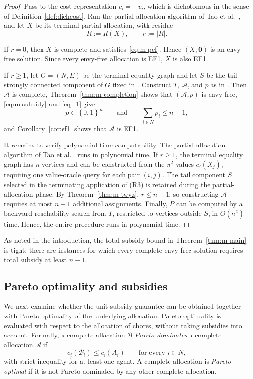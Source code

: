 \documentclass[sigconf,anonymous]{aamas}
\newcommand{\agents}{N}
\newcommand{\alloc}{\mathcal{A}}
\newcommand{\allocB}{\mathcal{B}}
\newcommand{\bundle}[1]{A_{#1}}
\newcommand{\subsidy}{p}
\newcommand{\cost}{c}
\newcommand{\set}[1]{\left\{#1\right\}}
\newcommand{\abs}[1]{\left\lvert#1\right\rvert}
\theoremstyle{acmplain}
\theoremstyle{acmdefinition}
\theoremstyle{acmplain}
\begin{document}
\begin{proof}
Pass to the cost representation $\cost_i=-v_i$, which is dichotomous in the sense of Definition~\ref{def:dichcost}. Run the partial-allocation algorithm of Tao et al.~\cite{tao2025existence}, and let $X$ be its terminal partial allocation, with residue
\[ R:=R(X), \qquad r:=\abs R.
\]

If $r=0$, then $X$ is complete and satisfies~\eqref{eq:m-pef}. Hence $(X,\mathbf 0)$ is an envy-free solution. Since every envy-free allocation is EF1, $X$ is also EF1.

If $r\geq 1$, let $G=(\agents,E)$ be the terminal equality graph and let $S$ be the tail strongly connected component of $G$ fixed in . Construct $T$, $\alloc$, and $\subsidy$ as in . Then $\alloc$ is complete, Theorem~\ref{thm:m-completion} shows that $(\alloc,\subsidy)$ is envy-free, \eqref{eq:m-subsidy} and \eqref{eq_1} give \[
    \subsidy\in\set{0,1}^n
    \qquad\text{and}\qquad
    \sum_{i\in\agents}\subsidy_i\leq n-1,
\] and Corollary~\ref{cor:ef1} shows that $\alloc$ is EF1.

It remains to verify polynomial-time computability. The partial-allocation algorithm of Tao et al.~\cite{tao2025existence} runs in polynomial time. If $r\geq1$, the terminal equality graph has $n$ vertices and can be constructed from the $n^2$ values $c_i(X_j)$, requiring one value-oracle query for each pair $(i,j)$. The tail component $S$ selected in the terminating application of \textnormal{(R3)} is retained during the partial-allocation phase. By Theorem~\ref{thm:m-twyz}, $r\leq n-1$, so constructing $\alloc$ requires at most $n-1$ additional assignments. Finally, $P$ can be computed by a backward reachability search from $T$, restricted to vertices outside $S$, in $O(n^2)$ time. Hence, the entire procedure runs in polynomial time. \end{proof}

As noted in the introduction, the total-subsidy bound in Theorem~\ref{thm:m-main} is tight: there are instances for which every complete envy-free solution requires total subsidy at least \(n-1\).



\subsection{Pareto optimality and subsidies}
We next examine whether the unit-subsidy guarantee can be obtained together with Pareto optimality of the underlying allocation. Pareto optimality is evaluated with respect to the allocation of chores, without taking subsidies into account. Formally, a complete allocation $\allocB$ \emph{Pareto dominates} a complete allocation $\alloc$ if
\[\cost_i(\allocB_i)\leq \cost_i(\bundle i)
    \qquad\text{for every }i\in\agents,
\]
with strict inequality for at least one agent. A complete allocation is \emph{Pareto optimal} if it is not Pareto dominated by any other complete allocation.
\end{document}
